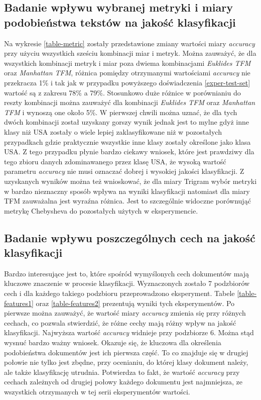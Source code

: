 \documentclass{classrep}
\begin{document}
{        \subsection{Badanie wpływu wybranej metryki i miary podobieństwa tekstów na jakość klasyfikacji} {
            Na wykresie \ref{table-metric} zostały przedstawione zmiany wartości miary \emph{accuracy}
            przy użyciu wszystkich sześciu kombinacji miar i metryk. Można zauważyć, że dla wszystkich
            kombinacji metryk i miar poza dwiema kombinacjami \emph{Euklides TFM} oraz \emph{Manhattan TFM}, różnica
            pomiędzy otrzymanymi wartościami \emph{accuracy} nie przekracza 1\% i tak jak w przypadku
            powyższego doświadczenia \ref{exper-test-set} wartość są z zakresu 78\% a 79\%. Stosunkowo
            duże różnice w porównianiu do reszty kombinacji można zauważyć dla kombinacji
            \emph{Euklides TFM} oraz \emph{Manhattan TFM} i wynoszą one około 5\%. W pierwszej chwili można uznać,
            że dla tych dwóch kombinacji został uzyskany gorszy wynik jednak jest to mylne gdyż
            inne klasy niż USA zostały o wiele lepiej zaklasyfikowane niż w pozostałych
            przypadkach gdzie praktycznie wszystkie inne klasy zostały określone jako klasa
            USA. Z tego przypadku płynie bardzo ciekawy wniosek, które jest prawdziwy dla tego
            zbioru danych zdominawanego przez klasę USA, że wysoką wartość parametru \emph{accuracy}
            nie musi oznaczać dobrej i wysokiej jakości klasyfikacji. Z uzyskanych wyników
            można też wnioskować, że dla miary Trigram wybór metryki w bardzo nieznaczny sposób
            wpływa na wyniki klasyfikacji natomiast dla miary TFM zauważalna jest wyraźna różnica.
            Jest to szczególnie widoczne porównująć metrykę Chebysheva do pozostałych użytych w eksperymencie.
        }

        \subsection{Badanie wpływu poszczególnych cech na jakość klasyfikacji} {
            Bardzo interesujące jest to, które spośród wymyślonych cech dokumentów mają kluczowe
            znaczenie w procesie klasyfikacji. Wyznaczonych zostało 7 podzbiorów cech i dla każdego
            takiego podzbioru przeprowadzono eksperyment. Tabele \ref{table-features1} oraz
            \ref{table-features2} prezentują wyniki tych eksperymentów. Po pierwsze można
            zauważyć, że wartość miary \emph{accuracy} zmienia się przy różnych cechach, co
            pozwala stwierdzić, że różne cechy mają różny wpływ na jakość klasyfikacji. Najwyższa
            wartość \emph{accuracy} widnieje przy podzbiorze 6. Można stąd wysnuć bardzo ważny
            wniosek. Okazuje się, że kluczowa dla określenia podobieństwa dokumentów jest ich
            pierwsza część. To co znajduje się w drugiej połowie nie tylko jest zbędne, przy
            ocenianiu, do której klasy dokument należy, ale także klasyfikację utrudnia. Potwierdza
            to fakt, że wartość \emph{accuracy} przy cechach zależnych od drugiej połowy każdego
            dokumentu jest najmniejsza, ze wszystkich otrzymanych w tej serii eksperymentów
            wartości.

}}
\end{document}
